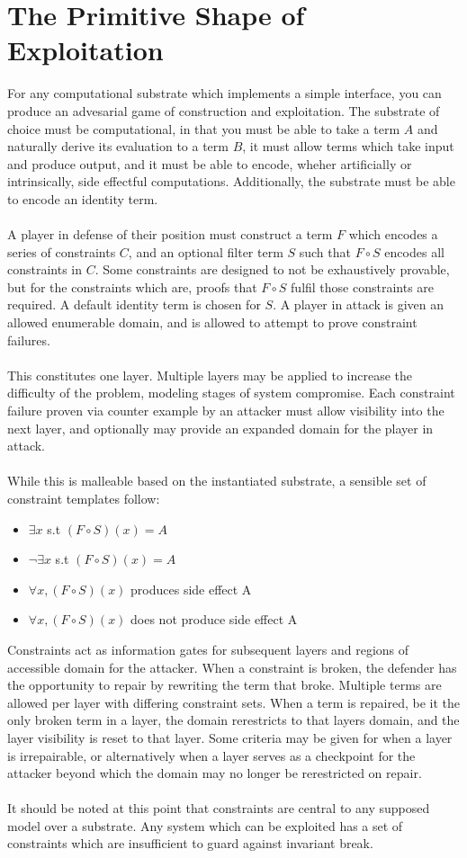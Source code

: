 \documentclass{article}
\begin{document}
	\section{The Primitive Shape of Exploitation}
	For any computational substrate which implements a simple interface, you can produce an advesarial game of construction and exploitation. 
The substrate of choice must be computational, in that you must be able to take a term $A$ and naturally derive its evaluation to a term $B$, it must allow terms which take input and produce output, and it must be able to encode, wheher artificially or intrinsically, side effectful computations. Additionally, the substrate must be able to encode an identity term. \\\\
	A player in defense of their position must construct a term $F$ which encodes a series of constraints $C$, and an optional filter term $S$ such that $F \circ S$ encodes all constraints in $C$. Some constraints are designed to not be exhaustively provable, but for the constraints which are, proofs that $F \circ S$ fulfil those constraints are required. A default identity term is chosen for $S$. A player in attack is given an allowed enumerable domain, and is allowed to attempt to prove constraint failures. \\\\
	This constitutes one layer. Multiple layers may be applied to increase the difficulty of the problem, modeling stages of system compromise. Each constraint failure proven via counter example by an attacker must allow visibility into the next layer, and optionally may provide an expanded domain for the player in attack.\\\\
	While this is malleable based on the instantiated substrate, a sensible set of constraint templates follow:
	\begin{itemize}
		\item[] $\exists x$ s.t $(F\circ S)(x) = A$
		\item[] $\neg\exists x$ s.t $(F\circ S)(x) = A$
		\item[] $\forall x, (F\circ S)(x)$ produces side effect A
		\item[] $\forall x, (F\circ S)(x)$ does not produce side effect A
	\end{itemize}
	Constraints act as information gates for subsequent layers and regions of accessible domain for the attacker. When a constraint is broken, the defender has the opportunity to repair by rewriting the term that broke. Multiple terms are allowed per layer with differing constraint sets. When a term is repaired, be it the only broken term in a layer, the domain rerestricts to that layers domain, and the layer visibility is reset to that layer. Some criteria may be given for when a layer is irrepairable, or alternatively when a layer serves as a checkpoint for the attacker beyond which the domain may no longer be rerestricted on repair.\\\\
	It should be noted at this point that constraints are central to any supposed model over a substrate. Any system which can be exploited has a set of constraints which are insufficient to guard against invariant break.
\end{document}
